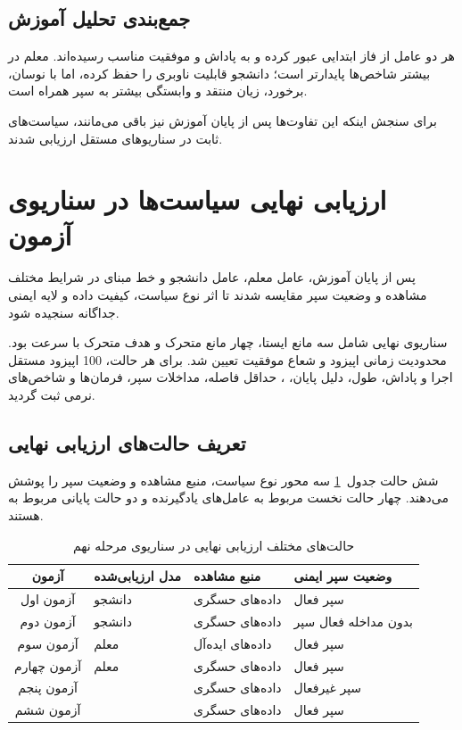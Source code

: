 \subsection{جمع‌بندی تحلیل آموزش}
\label{subsec:training_analysis_summary}

هر دو عامل از فاز ابتدایی عبور کرده و به پاداش و موفقیت مناسب رسیده‌اند. معلم در بیشتر شاخص‌ها پایدارتر است؛ دانشجو قابلیت ناوبری را حفظ کرده، اما با نوسان، برخورد، زیان منتقد و وابستگی بیشتر به سپر همراه است.

برای سنجش اینکه این تفاوت‌ها پس از پایان آموزش نیز باقی می‌مانند، سیاست‌های ثابت در سناریوهای مستقل ارزیابی شدند.

\section{ارزیابی نهایی سیاست‌ها در سناریوی آزمون}
\label{sec:final_policy_evaluation}

پس از پایان آموزش، عامل معلم، عامل دانشجو و خط مبنای  در شرایط مختلف مشاهده و وضعیت سپر مقایسه شدند تا اثر نوع سیاست، کیفیت داده و لایه ایمنی جداگانه سنجیده شود.

سناریوی نهایی شامل سه مانع ایستا، چهار مانع متحرک و هدف متحرک با سرعت  بود. محدودیت زمانی اپیزود  و شعاع موفقیت  تعیین شد. برای هر حالت، 100 اپیزود مستقل اجرا و پاداش، طول، دلیل پایان، ، حداقل فاصله، مداخلات سپر، فرمان‌ها و شاخص‌های نرمی ثبت گردید.

\subsection{تعریف حالت‌های ارزیابی نهایی}
\label{subsec:final_eval_protocol}

شش حالت جدول~\ref{tab:final_eval_modes} سه محور نوع سیاست، منبع مشاهده و وضعیت سپر را پوشش می‌دهند. چهار حالت نخست مربوط به عامل‌های یادگیرنده و دو حالت پایانی مربوط به  هستند.

\begin{table}[htbp]
	\centering
	\caption{حالت‌های مختلف ارزیابی نهایی در سناریوی مرحله نهم}
	\label{tab:final_eval_modes}
	\small
	\begin{tabular}{c p{3.2cm} p{3.0cm} p{3.5cm}}
		\hline
		آزمون & مدل ارزیابی‌شده & منبع مشاهده & وضعیت سپر ایمنی \\
		\hline
		آزمون اول & دانشجو & داده‌های حسگری & سپر فعال \\
		آزمون دوم & دانشجو & داده‌های حسگری & بدون مداخله فعال سپر \\
		آزمون سوم & معلم & داده‌های ایده‌آل & سپر فعال \\
		آزمون چهارم & معلم & داده‌های حسگری & سپر فعال \\
		آزمون پنجم & \lr{MPC} & داده‌های حسگری & سپر غیرفعال \\
		آزمون ششم & \lr{MPC} & داده‌های حسگری & سپر فعال \\
		\hline
	\end{tabular}
\end{table}

